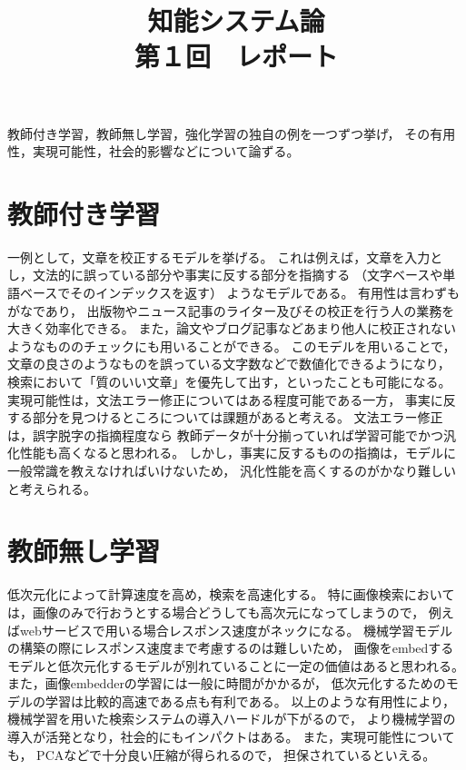 \documentclass[dvipdfmx, fleqn, titlepage]{jsarticle}
\title{
	知能システム論 \\
	第１回　レポート
	}
\begin{document}
\maketitle

教師付き学習，教師無し学習，強化学習の独自の例を一つずつ挙げ，
その有用性，実現可能性，社会的影響などについて論ずる。


\section{教師付き学習}

一例として，文章を校正するモデルを挙げる。
これは例えば，文章を入力とし，文法的に誤っている部分や事実に反する部分を指摘する
（文字ベースや単語ベースでそのインデックスを返す）
ようなモデルである。
有用性は言わずもがなであり，
出版物やニュース記事のライター及びその校正を行う人の業務を大きく効率化できる。
また，論文やブログ記事などあまり他人に校正されないようなもののチェックにも用いることができる。
このモデルを用いることで，文章の良さのようなものを誤っている文字数などで数値化できるようになり，
検索において「質のいい文章」を優先して出す，といったことも可能になる。
実現可能性は，文法エラー修正についてはある程度可能である一方，
事実に反する部分を見つけるところについては課題があると考える。
文法エラー修正は，誤字脱字の指摘程度なら
教師データが十分揃っていれば学習可能でかつ汎化性能も高くなると思われる。
しかし，事実に反するものの指摘は，モデルに一般常識を教えなければいけないため，
汎化性能を高くするのがかなり難しいと考えられる。



\section{教師無し学習}

低次元化によって計算速度を高め，検索を高速化する。
特に画像検索においては，画像のみで行おうとする場合どうしても高次元になってしまうので，
例えばwebサービスで用いる場合レスポンス速度がネックになる。
機械学習モデルの構築の際にレスポンス速度まで考慮するのは難しいため，
画像をembedするモデルと低次元化するモデルが別れていることに一定の価値はあると思われる。
また，画像embedderの学習には一般に時間がかかるが，
低次元化するためのモデルの学習は比較的高速である点も有利である。
以上のような有用性により，
機械学習を用いた検索システムの導入ハードルが下がるので，
より機械学習の導入が活発となり，社会的にもインパクトはある。
また，実現可能性についても，
PCAなどで十分良い圧縮が得られるので，
担保されているといえる。
\end{document}
